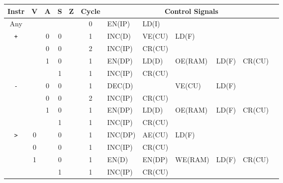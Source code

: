 

  \begin{longtable}[c] {c|cccc|c|llllll}
                     Instr        & V & A & S     & Z    & Cycle & \multicolumn{6}{c}{Control Signals}                      \\ \hline
    \rowcolor{White} Any          &   &   &       &      & 0     & EN(IP)   & LD(I)    &         &        &        &        \\ \hline
    \rowcolor{Gray}  \texttt{+}   &   & 0 & 0     &      & 1     & INC(D)   & VE(CU)   & LD(F)   &        &        &        \\
    \rowcolor{Gray}               &   & 0 & 0     &      & 2     & INC(IP)  & CR(CU)   &         &        &        &        \\    
    \rowcolor{White}              &   & 1 & 0     &      & 1     & EN(DP)   & LD(D)    & OE(RAM) & LD(F)  & CR(CU) &        \\
    \rowcolor{Gray}               &   &   & 1     &      & 1     & INC(IP)  & CR(CU)   &         &        &        &        \\ \hline
    
    \rowcolor{White} \texttt{-}   &   & 0 & 0     &      & 1     & DEC(D)   &          & VE(CU)  & LD(F)  &        &        \\
    \rowcolor{White}              &   & 0 & 0     &      & 2     & INC(IP)  & CR(CU)   &         &        &        &        \\
    \rowcolor{Gray}               &   & 1 & 0     &      & 1     & EN(DP)   & LD(D)    & OE(RAM) & LD(F)  & CR(CU) &        \\
    \rowcolor{White}              &   &   & 1     &      & 1     & INC(IP)  & CR(CU)   &         &        &        &        \\ \hline
    
    \rowcolor{Gray}  \texttt{>}   & 0 &   & 0     &      & 1     & INC(DP)  & AE(CU)   & LD(F)   &        &        &        \\
    \rowcolor{Gray}               & 0 &   & 0     &      & 1     & INC(IP)  & CR(CU)   &         &        &        &        \\
    \rowcolor{White}              & 1 &   & 0     &      & 1     & EN(D)    & EN(DP)   & WE(RAM) & LD(F)  & CR(CU) &        \\
    \rowcolor{Gray}               &   &   & 1     &      & 1     & INC(IP)  & CR(CU)   &         &        &        &        \\ \hline
    

\end{longtable}
